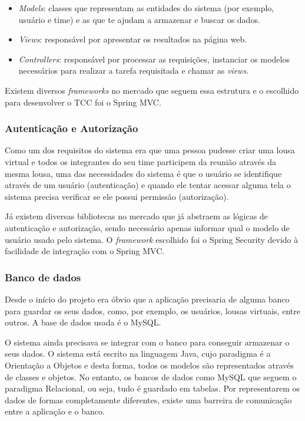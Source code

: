 \begin{itemize}
	\item \textit{Models}: classes que representam as entidades do sistema (por exemplo, usuário e time) e as que te ajudam a armazenar e buscar os dados.
	\item \textit{Views}: responsável por apresentar os resultados na página web.
	\item \textit{Controllers}: responsável por processar as requisições, instanciar os modelos necessários para realizar a tarefa requisitada e chamar as \textit{views}.
\end{itemize}

Existem diversos \textit{frameworks} no mercado que seguem essa estrutura e o escolhido para desenvolver o TCC foi o Spring MVC.

\subsubsection*{Autenticação e Autorização}

Como um dos requisitos do sistema era que uma pessoa pudesse criar uma lousa virtual e todos os integrantes do seu time participem da reunião através da mesma lousa, uma das necessidades do sistema é que o usuário se identifique através de um usuário (autenticação) e quando ele tentar acessar alguma tela o sistema precisa verificar se ele possui permissão (autorização).

Já existem diversas bibliotecas no mercado que já abstraem as lógicas de autenticação e autorização, sendo necessário apenas informar qual o modelo de usuário usado pelo sistema. O \textit{framework} escolhido foi o Spring Security devido à facilidade de integração com o Spring MVC.

\subsubsection*{Banco de dados}

Desde o início do projeto era óbvio que a aplicação precisaria de alguma banco para guardar os seus dados, como, por exemplo, os usuários, lousas virtuais, entre outros. A base de dados usada é o MySQL.

O sistema ainda precisava se integrar com o banco para conseguir armazenar o seus dados. O sistema está escrito na linguagem Java, cujo paradigma é a Orientação a Objetos e desta forma, todos os modelos são representados através de classes e objetos. No entanto, os bancos de dados como MySQL que seguem o paradigma Relacional, ou seja, tudo é guardado em tabelas. Por representarem os dados de formas completamente diferentes, existe uma barreira de comunicação entre a aplicação e o banco.

